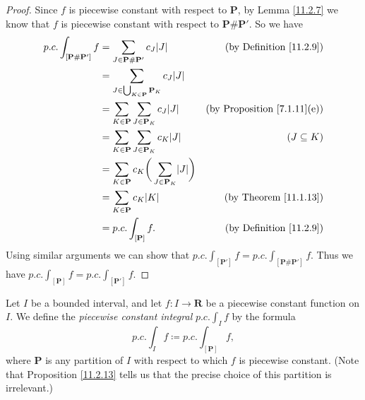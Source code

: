 \begin{proof}
    Since \(f\) is piecewise constant with respect to \(\mathbf{P}\), by Lemma \ref{11.2.7} we know that \(f\) is piecewise constant with respect to \(\mathbf{P} \# \mathbf{P}'\).
    So we have
    \begin{align*}
        p.c. \int_{[\mathbf{P} \# \mathbf{P}']} f & = \sum_{J \in \mathbf{P} \# \mathbf{P}'} c_J \abs*{J}                        & \text{(by Definition \ref{11.2.9})}     \\
                                                  & = \sum_{J \in \bigcup_{K \in \mathbf{P}} \mathbf{P}_K} c_J \abs*{J}                                                    \\
                                                  & = \sum_{K \in \mathbf{P}} \sum_{J \in \mathbf{P}_K} c_J \abs*{J}             & \text{(by Proposition \ref{7.1.11}(e))} \\
                                                  & = \sum_{K \in \mathbf{P}} \sum_{J \in \mathbf{P}_K} c_K \abs*{J}             & (J \subseteq K)                         \\
                                                  & = \sum_{K \in \mathbf{P}} c_K \bigg(\sum_{J \in \mathbf{P}_K} \abs*{J}\bigg)                                           \\
                                                  & = \sum_{K \in \mathbf{P}} c_K \abs*{K}                                       & \text{(by Theorem \ref{11.1.13})}       \\
                                                  & = p.c. \int_{[\mathbf{P}]} f.                                                & \text{(by Definition \ref{11.2.9})}
    \end{align*}
    Using similar arguments we can show that \(p.c. \int_{[\mathbf{P}']} f = p.c. \int_{[\mathbf{P} \# \mathbf{P}']} f\).
    Thus we have \(p.c. \int_{[\mathbf{P}]} f = p.c. \int_{[\mathbf{P}']} f\).
\end{proof}

\begin{definition}\label{11.2.14}
    Let \(I\) be a bounded interval, and let \(f : I \to \mathbf{R}\) be a piecewise constant function on \(I\).
    We define the \emph{piecewise constant integral} \(p.c. \int_I f\) by the formula
    \[
        p.c. \int_I f \coloneqq p.c. \int_{[\mathbf{P}]} f,
    \]
    where \(\mathbf{P}\) is any partition of \(I\) with respect to which \(f\) is piecewise constant.
    (Note that Proposition \ref{11.2.13} tells us that the precise choice of this partition is irrelevant.)
\end{definition}

